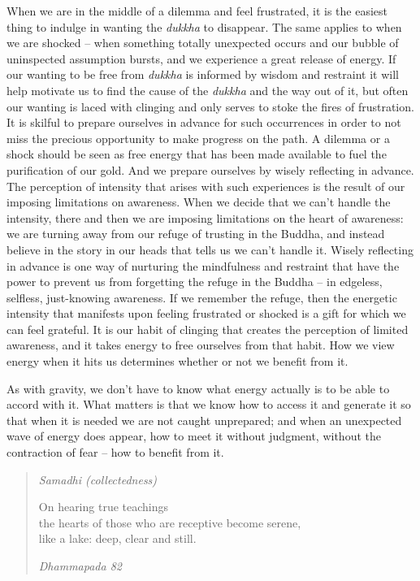 When we are in the middle of a dilemma and feel frustrated, it is the
easiest thing to indulge in wanting the \emph{dukkha} to disappear. The
same applies to when we are shocked -- when something totally unexpected
occurs and our bubble of uninspected assumption bursts, and we
experience a great release of energy. If our wanting to be free from
\emph{dukkha} is informed by wisdom and restraint it will help motivate
us to find the cause of the \emph{dukkha} and the way out of it, but
often our wanting is laced with clinging and only serves to stoke the
fires of frustration. It is skilful to prepare ourselves in advance for
such occurrences in order to not miss the precious opportunity to make
progress on the path. A dilemma or a shock should be seen as free energy
that has been made available to fuel the purification of our gold. And
we prepare ourselves by wisely reflecting in advance. The perception of
intensity that arises with such experiences is the result of our
imposing limitations on awareness. When we decide that we can't handle
the intensity, there and then we are imposing limitations on the heart
of awareness: we are turning away from our refuge of trusting in the
Buddha, and instead believe in the story in our heads that tells us we
can't handle it. Wisely reflecting in advance is one way of nurturing
the mindfulness and restraint that have the power to prevent us from
forgetting the refuge in the Buddha -- in edgeless, selfless,
just-knowing awareness. If we remember the refuge, then the energetic
intensity that manifests upon feeling frustrated or shocked is a gift
for which we can feel grateful. It is our habit of clinging that creates
the perception of limited awareness, and it takes energy to free
ourselves from that habit. How we view energy when it hits us determines
whether or not we benefit from it.

As with gravity, we don't have to know what energy actually is to be
able to accord with it. What matters is that we know how to access it
and generate it so that when it is needed we are not caught unprepared;
and when an unexpected wave of energy does appear, how to meet it
without judgment, without the contraction of fear -- how to benefit from
it.

\begin{quote}
  \emph{Samadhi (collectedness)}

  On hearing true teachings\\
  the hearts of those who are receptive become serene,\\
  like a lake: deep, clear and still.

  \emph{Dhammapada 82}
\end{quote}

